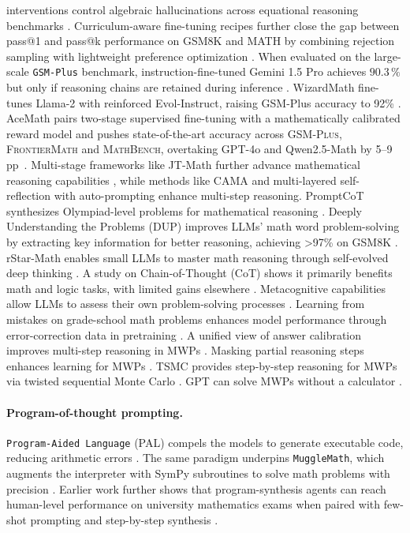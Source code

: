 \documentclass[acmsmall,anonymous]{acmart}
\begin{document}
interventions control algebraic hallucinations across equational reasoning benchmarks \cite{yamauchi-2023-lpml,meadows-2025-prompt-interventions}.  Curriculum-aware fine-tuning recipes further close the gap between pass@1 and pass@k performance on GSM8K and MATH by combining rejection sampling with lightweight preference optimization \cite{liu-2023-improving-finetune}.  When evaluated on the large-scale \texttt{GSM-Plus} benchmark, instruction-fine-tuned Gemini 1.5 Pro achieves $90.3\,\%$ but only if reasoning chains are retained during inference \cite{li2024gsmplus}. WizardMath fine-tunes Llama-2 with reinforced Evol-Instruct, raising GSM-Plus accuracy to 92\% \cite{luo2025wizardmath}.  AceMath pairs two-stage supervised fine-tuning with a mathematically
calibrated reward model and pushes state-of-the-art accuracy across
\textsc{GSM-Plus}, \textsc{FrontierMath} and \textsc{MathBench}, overtaking GPT-4o and
Qwen2.5-Math by 5–9 pp~\citep{liu2024acemath}. Multi-stage frameworks like JT-Math further advance mathematical reasoning capabilities \cite{anonymous2025jtmath,anonymous2025jtmath}, while methods like CAMA \cite{anonymous2025cama,anonymous2025cama} and multi-layered self-reflection with auto-prompting \cite{anonymous2025advancingmultistep,anonymous2025advancingmultistep} enhance multi-step reasoning. PromptCoT synthesizes Olympiad-level problems for mathematical reasoning \cite{zhao-etal-2025-promptcot}. Deeply Understanding the Problems (DUP) improves LLMs' math word problem-solving by extracting key information for better reasoning, achieving >97\% on GSM8K \cite{zhong2024achieving}. rStar-Math enables small LLMs to master math reasoning through self-evolved deep thinking \cite{guan2025rstar}. A study on Chain-of-Thought (CoT) shows it primarily benefits math and logic tasks, with limited gains elsewhere \cite{sprague2024a to}. Metacognitive capabilities allow LLMs to assess their own problem-solving processes \cite{didolkar2024metacognitive}. Learning from mistakes on grade-school math problems enhances model performance through error-correction data in pretraining \cite{ye2024physics}. A unified view of answer calibration improves multi-step reasoning in MWPs \cite{deng2023}. Masking partial reasoning steps enhances learning for MWPs \cite{chen2024a}. TSMC provides step-by-step reasoning for MWPs via twisted sequential Monte Carlo \cite{feng2024}. GPT can solve MWPs without a calculator \cite{yang2023b}.

\paragraph{Program-of-thought prompting.}
\texttt{Program-Aided Language} (PAL) compels the models to generate executable code, reducing arithmetic errors \cite{chen2022program,gao2022pal}.  The same paradigm underpins \texttt{MuggleMath}, which augments the interpreter with SymPy subroutines to solve math problems with precision \cite{li2024mugglemath}.
Earlier work further shows that program-synthesis agents can reach human-level performance on university mathematics exams when paired with few-shot prompting and step-by-step synthesis \cite{drori-2022-program-synthesis}.
\end{document}
